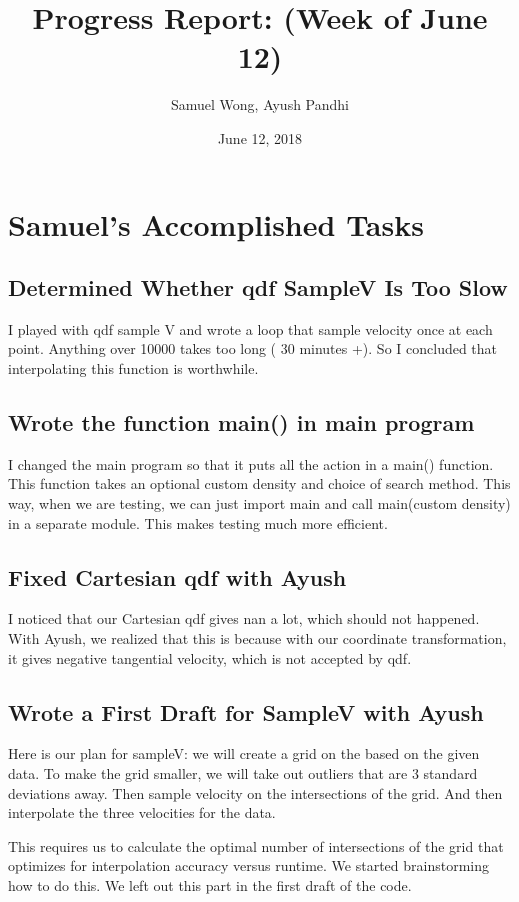 \documentclass[12pt]{article}
\begin{document}
\title{Progress Report: (Week of June 12)}
\author{Samuel Wong, Ayush Pandhi}
\date{June 12, 2018}
\maketitle


\section{Samuel's Accomplished Tasks}

\subsection{Determined Whether qdf SampleV Is Too Slow}
I played with qdf sample V and wrote a loop that sample velocity once at each point. Anything over 10000 takes too long ( 30 minutes +). So I concluded that interpolating this function is worthwhile.

\subsection{Wrote the function main() in main program}
I changed the main program so that it puts all the action in a main() function.
This function takes an optional custom density and choice of search method. This way, when we are testing, we can just import main and call main(custom density) in a separate module. This makes testing much more efficient.

\subsection{Fixed Cartesian qdf with Ayush}
I noticed that our Cartesian qdf gives nan a lot, which should not happened. With Ayush, we realized that this is because with our coordinate transformation, it gives negative tangential velocity, which is not accepted by qdf.

\subsection{Wrote a First Draft for SampleV with Ayush}
Here is our plan for sampleV: we will create a grid on the based on the given data. To make the grid smaller, we will take out outliers that are 3 standard deviations away. Then sample velocity on the intersections of the grid. And then interpolate the three velocities for the data.

This requires us to calculate the optimal number of intersections of the grid that optimizes for interpolation accuracy versus runtime. We started brainstorming how to do this. We left out this part in the first draft of the code.
\end{document}

